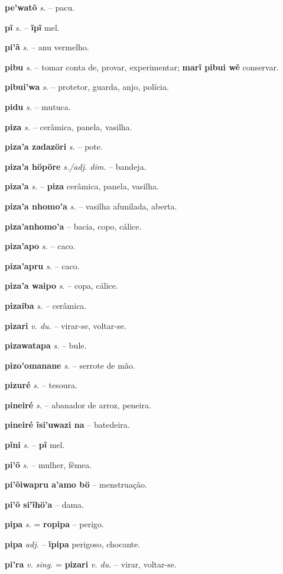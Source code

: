 \textbf{pe'watõ} \textit{s.} -- pacu.

\textbf{pĩ} \textit{s.} -- \textbf{ĩpĩ} mel.

\textbf{pi'ã} \textit{s.} -- anu vermelho.

\textbf{pibu} \textit{s.} -- tomar conta de, provar, experimentar; \textbf{marĩ pibui wẽ} conservar.

\textbf{pibui'wa} \textit{s.} -- protetor, guarda, anjo, polícia.

\textbf{pidu} \textit{s.} -- mutuca.

\textbf{piza} \textit{s.} -- cerâmica, panela, vasilha.

\textbf{piza'a zadazöri} \textit{s.} -- pote.

\textbf{piza'a höpöre} \textit{s./adj. dim.} -- bandeja.

\textbf{piza'a} \textit{s.} -- \textbf{piza} cerâmica, panela, vasilha.

\textbf{piza'a nhomo'a} \textit{s.} -- vasilha afunilada, aberta.

\textbf{piza'anhomo'a} -- bacia, copo, cálice.

\textbf{piza'apo} \textit{s.} -- caco.

\textbf{piza'apru} \textit{s.} -- caco.

\textbf{piza'a waipo} \textit{s.} -- copa, cálice.

\textbf{pizaiba} \textit{s.} -- cerâmica.

\textbf{pizari} \textit{v. du.} -- virar-se, voltar-se.

\textbf{pizawatapa} \textit{s.} -- bule.

\textbf{pizo'omanane} \textit{s.} -- serrote de mão.

\textbf{pizuré} \textit{s.} -- tesoura.

\textbf{pineiré} \textit{s.} -- abanador de arroz, peneira.

\textbf{pineiré ĩsi'uwazi na} -- batedeira.

\textbf{pĩni} \textit{s.} -- \textbf{pĩ} mel.

\textbf{pi'õ} \textit{s.} -- mulher, fêmea.

\textbf{pi'õiwapru a'amo bö} -- menstruação.

\textbf{pi'õ si'ĩhö'a} -- dama.

\textbf{pipa} \textit{s.} = \textbf{ropipa} -- perigo.

\textbf{pipa} \textit{adj.} -- \textbf{ĩpipa} perigoso, chocante.

\textbf{pi'ra} \textit{v. sing.} = \textbf{pizari} \textit{v. du.} -- virar, voltar-se.

